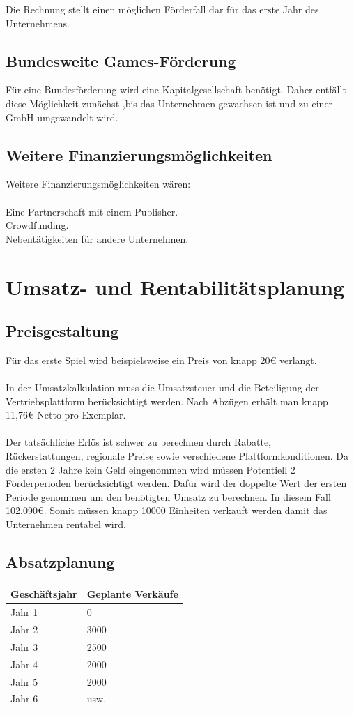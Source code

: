 \documentclass[envcountsame,envcountchap deutsch]{i-studis}
\begin{document}
Die Rechnung stellt einen möglichen Förderfall dar für das erste Jahr des Unternehmens.

\section{Bundesweite Games-Förderung}
Für eine Bundesförderung wird eine Kapitalgesellschaft benötigt. Daher entfällt diese Möglichkeit zunächst ,bis das Unternehmen gewachsen ist und zu einer GmbH umgewandelt wird.
\section{Weitere Finanzierungsmöglichkeiten}
Weitere Finanzierungsmöglichkeiten wären: \\\\
Eine Partnerschaft mit einem Publisher. \\
Crowdfunding. \\
Nebentätigkeiten für andere Unternehmen. \\
\chapter{Umsatz- und Rentabilitätsplanung}
\section{Preisgestaltung}
Für das erste Spiel wird beispielsweise ein Preis von knapp 20€ verlangt.\\
\\
In der Umsatzkalkulation muss die Umsatzsteuer und die Beteiligung der Vertriebsplattform berücksichtigt werden. Nach Abzügen erhält man knapp 11,76€ Netto pro Exemplar.
\\
\\
Der tatsächliche Erlös ist schwer zu berechnen durch Rabatte, \\Rückerstattungen, regionale Preise sowie verschiedene Plattformkonditionen.
Da die ersten 2 Jahre kein Geld eingenommen wird müssen Potentiell 2 Förderperioden berücksichtigt werden. Dafür wird der doppelte Wert der ersten Periode genommen um den benötigten Umsatz zu berechnen. In diesem Fall 102.090€.
Somit müssen knapp 10000 Einheiten verkauft werden damit das Unternehmen rentabel wird.

\section{Absatzplanung}
\begin{table}[ht]
	\centering
	\begin{tabular}{|p{3cm}|p{3cm}|}
		\hline
		\textbf{Geschäftsjahr}  & \textbf{Geplante Verkäufe} \\ \hline
		Jahr 1  & 0 \\ \hline
		Jahr 2  & 3000 \\ \hline
		Jahr 3  & 2500 \\ \hline
		Jahr 4  & 2000 \\ \hline
		Jahr 5  & 2000 \\ \hline
		Jahr 6  & usw. \\ \hline
	\end{tabular}
\end{table}
\end{document}
